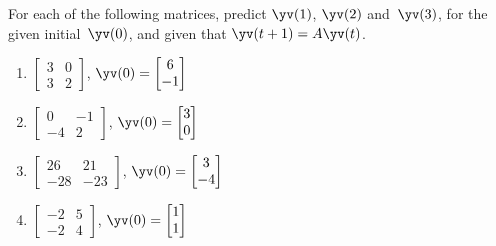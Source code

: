 \begin{exercise} \label{ex:yay} 
For each of the following matrices, predict \(\yv(1)\), \(\yv(2)\) and~\(\yv(3)\), for the given initial~\(\yv(0)\), and given that \(\yv(t+1)=A\yv(t)\).
\begin{enumerate}
\item \(\begin{bmatrix} 3 & 0
\\3 & 2 \end{bmatrix}\), 
\(\yv(0)=\begin{bmatrix} 6
\\-1 \end{bmatrix}\)

\item \(\begin{bmatrix} 0 & -1
\\-4 & 2 \end{bmatrix}\), 
\(\yv(0)=\begin{bmatrix} 3
\\0 \end{bmatrix}\)

\item \(\begin{bmatrix} 26 & 21
\\-28 & -23 \end{bmatrix}\), 
\(\yv(0)=\begin{bmatrix} 3
\\-4 \end{bmatrix}\)

\item \(\begin{bmatrix} -2 & 5
\\-2 & 4 \end{bmatrix}\), 
\(\yv(0)=\begin{bmatrix} 1
\\1 \end{bmatrix}\)


\end{enumerate}
\end{exercise}
